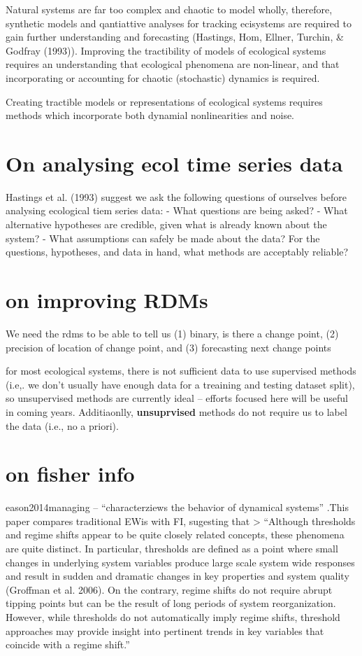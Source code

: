 \documentclass[12pt,twoside,openany]{reedthesis}
\begin{document}
Natural systems are far too complex and chaotic to model wholly,
therefore, synthetic models and qantiattive analyses for tracking
ecisystems are required to gain further understanding and forecasting
(Hastings, Hom, Ellner, Turchin, \& Godfray (1993)). Improving the
tractibility of models of ecological systems requires an understanding
that ecological phenomena are non-linear, and that incorporating or
accounting for chaotic (stochastic) dynamics is required.

Creating tractible models or representations of ecological systems
requires methods which incorporate both dynamial nonlinearities and
noise.

\section{On analysing ecol time series
data}\label{on-analysing-ecol-time-series-data}

Hastings et al. (1993) suggest we ask the following questions of
ourselves before analysing ecological tiem series data: - What questions
are being asked? - What alternative hypotheses are credible, given what
is already known about the system? - What assumptions can safely be made
about the data? For the questions, hypotheses, and data in hand, what
methods are acceptably reliable?

\section{on improving RDMs}\label{on-improving-rdms}

We need the rdms to be able to tell us (1) binary, is there a change
point, (2) precision of location of change point, and (3) forecasting
next change points

for most ecological systems, there is not sufficient data to use
supervised methods (i.e,. we don't usually have enough data for a
treaining and testing dataset split), so unsupervised methods are
currently ideal -- efforts focused here will be useful in coming years.
Additiaonlly, \textbf{unsuprvised} methods do not require us to label
the data (i.e., no a priori).

\section{on fisher info}\label{on-fisher-info}

eason2014managing -- ``characterziews the behavior of dynamical
systems'' .This paper compares traditional EWis with FI, sugesting that
\textgreater{} ``Although thresholds and regime shifts appear to be
quite closely related concepts, these phenomena are quite distinct. In
particular, thresholds are defined as a point where small changes in
underlying system variables produce large scale system wide responses
and result in sudden and dramatic changes in key properties and system
quality (Groffman et al. 2006). On the contrary, regime shifts do not
require abrupt tipping points but can be the result of long periods of
system reorganization. However, while thresholds do not automatically
imply regime shifts, threshold approaches may provide insight into
pertinent trends in key variables that coincide with a regime shift.''
\end{document}
